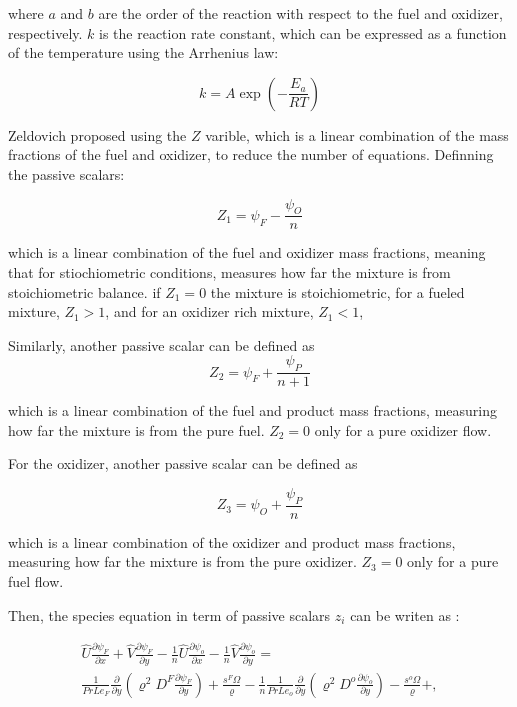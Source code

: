 where $a$ and $b$ are the order of the reaction with respect to the fuel and
oxidizer, respectively. $k$ is the reaction rate constant, which can be expressed
as a function of the temperature using the Arrhenius law:

\begin{equation}
k=A\exp\left(-\frac{E_a}{RT}\right)
\end{equation}

Zeldovich proposed using the $Z$ varible, which is a linear combination of the
mass fractions of the fuel and oxidizer, to reduce the number of
equations. Definning the passive scalars:

\begin{equation}
Z_1=
\psi_F
-
\frac{\psi_O}{n}
\end{equation}          

which is a linear combination of the fuel and oxidizer mass fractions, 
meaning that for stiochiometric conditions, 
measures how far the mixture is from stoichiometric balance.
if $Z_1=0$ the mixture is stoichiometric, for a 
fueled mixture, $Z_1>1$, and for an oxidizer rich mixture, $Z_1<1$, 

Similarly, another passive scalar can be defined as
\begin{equation}
Z_2=
\psi_F
+
\frac{\psi_P}{n+1}
\end{equation}          

which is a linear combination of the fuel and product mass fractions,
measuring how far the mixture is from the pure fuel. 
$Z_2=0$ only for a pure oxidizer flow. 
 
For the oxidizer, another passive scalar can be defined as

\begin{equation}
Z_3=
\psi_O
+
\frac{\psi_P}{n}
\end{equation}          

which is a linear combination of the oxidizer and product mass fractions,
measuring how far the mixture is from the pure oxidizer. 
$Z_3=0$ only for a pure fuel flow. 

Then, the species equation in term of passive scalars $z_i$ can be writen as  :  

\begin{equation} 
\begin{split} 
 \hat{U}\frac{\partial \psi_{F}}{\partial x}
 +
 \hat{V}\frac{\partial \psi_{F}}{\partial y}
 -
 \frac{1}{n}
 \hat{U}\frac{\partial \psi_{o}}{\partial x}
 -
 \frac{1}{n}
 \hat{V}\frac{\partial \psi_{o}}{\partial y}
=
\\
\frac{1}{PrLe_F}\frac{\partial}{\partial y}
\left(\varrho^2 D^F\frac{\partial \psi_F}{\partial y}\right)
+
\frac{s^{F}\Omega}{\varrho}
-
\frac{1}{n}
\frac{1}{PrLe_o}\frac{\partial}{\partial y}
\left(
       \varrho^2 D^o\frac{\partial \psi_o}{\partial y}
\right)
-
\frac{s^{o}\Omega}{\varrho}
+
,
\end{split} 
\end{equation} 
  
